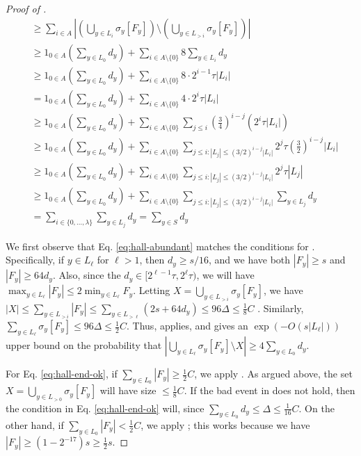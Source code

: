 \documentclass[10pt]{article}
\theoremstyle{definition}\newtheorem{definition}[lemma]{Definition}
\theoremstyle{remark}  \newtheorem*{remark}{Remark}
\begin{document}
\begin{proof}[Proof of ]
\begin{align*}
      &\ge \sum_{i \in A} | (\bigcup_{y \in L_i} \sigma_y[F_y]) \setminus (\bigcup_{y \in L_{> i}} \sigma_y[F_y]) | \\
      &\ge 1_{0 \in A} \left(\sum_{y \in L_0} d_y\right) + \sum_{i \in A \setminus \{0\}} 8 \sum_{y \in L_i} d_y \\
      &\ge 1_{0 \in A} \left(\sum_{y \in L_0} d_y\right) + \sum_{i \in A \setminus \{0\}} 8 \cdot 2^{i - 1} \tau |L_i| \\
      &= 1_{0 \in A} \left(\sum_{y \in L_0} d_y\right) + \sum_{i \in A \setminus \{0\}} 4 \cdot 2^{i} \tau |L_i| \\
      &\ge 1_{0 \in A} \left(\sum_{y \in L_0} d_y\right) + \sum_{i \in A \setminus \{0\}} \sum_{j \le i} \left(\frac{3}{4}\right)^{i - j} \left(2^{i} \tau |L_i|\right)  \\
      &\ge 1_{0 \in A} \left(\sum_{y \in L_0} d_y\right) + \sum_{i \in A \setminus \{0\}} \sum_{j \le i : |L_j| \le (3/2)^{i - j}|L_i|}  2^{j} \tau \left(\frac{3}{2}\right)^{i - j} |L_i|  \\
      &\ge 1_{0 \in A} \left(\sum_{y \in L_0} d_y\right) + \sum_{i \in A \setminus \{0\}} \sum_{j \le i : |L_j| \le (3/2)^{i - j}|L_i|}  2^{j} \tau |L_j| \\
      &\ge 1_{0 \in A} \left(\sum_{y \in L_0} d_y\right) + \sum_{i \in A \setminus \{0\}} \sum_{j \le i : |L_j| \le (3/2)^{i - j}|L_i|}  \sum_{y \in L_j} d_y  \\
      &=  \sum_{i \in \{0,\ldots,\lambda\}} \sum_{y \in L_j} d_y = \sum_{y \in S} d_y
  \end{align*}
  
  We first observe that Eq. \ref{eq:hall-abundant} matches the conditions for . Specifically, if $y \in L_\ell$ for $\ell > 1$, then $d_y \ge s / 16$, and we have both $|F_y| \ge s$ and $|F_y| \ge 64 d_y$. Also, since the $d_y \in [2^{\ell-1} \tau, 2^\ell \tau)$, we will have $\max_{y \in L_\ell} |F_y| \le 2 \min_{y \in L_\ell} F_y$. Letting $X = \bigcup_{y \in L_{> i}} \sigma_y[F_y]$, we have $|X| \le \sum_{y \in L_{> i}} |F_y| \le \sum_{y \in L_{> \ell}} (2s + 64 d_y) \le 96 \Delta \le \frac{1}{8} C$ . Similarly, $\sum_{y \in L_{\ell}} \sigma_y[F_y] \le 96 \Delta \le \frac{1}{2} C$. Thus,  applies, and gives an $\exp(- O(s |L_\ell|))$ upper bound on the probability that $|\bigcup_{y \in L_\ell} \sigma_y[F_y] \setminus X| \ge 4 \sum_{y \in L_0} d_y$.
  
  For Eq. \ref{eq:hall-end-ok}, if $\sum_{y \in L_0}{|F_y|} \ge \frac{1}{2} C$, we apply . As argued above, the set $X = \bigcup_{y \in L_{> 0}} \sigma_y[F_y]$ will have size $\le \frac{1}{8} C$. If the bad event in  does not hold, then the condition in Eq. \ref{eq:hall-end-ok} will, since $\sum_{y \in L_0} d_y \le \Delta \le \frac{1}{16} C$. On the other hand, if $\sum_{y \in L_0}{|F_y|} < \frac{1}{2} C$, we apply ; this works because we have $|F_y| \ge (1 - 2^{-17}) s \ge \frac{1}{2} s$.


\end{proof}
\end{document}
